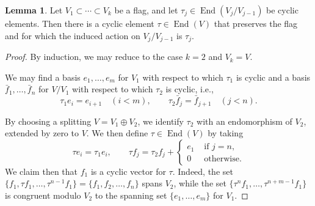 \documentclass[reqno]{amsart}
\DeclareMathOperator{\End}{End}
\theoremstyle{plain} \newtheorem{theorem} {Theorem} \newtheorem{conjecture} {Conjecture} \newtheorem{corollary} [theorem] {Corollary} \newtheorem{proposition} [theorem] {Proposition} \newtheorem{fact} [theorem] {Fact}
\theoremstyle{definition} \newtheorem{definition} [theorem] {Definition}
\theoremstyle{itplain} %
\newtheorem{lemma}[theorem]{Lemma}
\begin{document}
\begin{lemma}\label{lemma:let-v_1-subs-dotsb-subs-v_k-be-flag-let-tau_j-in-e}
  Let $V_1 \subset \dotsb \subset V_k$ be a flag, and let $\tau_j \in \End(V_j / V_{j-1})$ be cyclic elements.  Then there is a cyclic element $\tau \in \End(V)$ that preserves the flag and for which the induced action on $V_j / V_{j-1}$ is $\tau_j$.
\end{lemma}
\begin{proof}
  By induction, we may reduce to the case $k = 2$ and $V_k = V$.
  
  We may find a basis $e_1,\dotsc,e_m$ for $V_1$ with respect to which $\tau_1$ is cyclic and a basis $\bar{f}_1,\dotsc,\bar{f}_n$ for $V/V_1$ with respect to which $\tau_2$ is cyclic, i.e.,
  \begin{equation*}
    \tau_1 e_i = e_{i+1}  \quad (i  < m), \qquad
    \tau_2 \bar{f}_j = \bar{f}_{j+1} \quad (j < n).
  \end{equation*}

  By choosing a splitting $V = V_1 \oplus V_2$, we identify $\tau_2$ with an endomorphism of $V_2$, extended by zero to $V$.  We then define $\tau \in \End(V)$ by taking
  \begin{equation*}
    \tau e_i = \tau_1 e_{i},
    \qquad
    \tau f_j =
    \tau_2 f_j
    +
    \begin{cases}
      e_1 & \text{ if } j = n, \\
      0 & \text{ otherwise.}
    \end{cases}
  \end{equation*}
  We claim then that $f_1$ is a cyclic vector for $\tau$.  Indeed, the set $\{f_1, \tau f_1, \dotsc, \tau^{n-1} f_1\} = \{f_1, f_2, \dotsc, f_{n}\}$ spans $V_2$, while the set $\{\tau^n f_1, \dotsc, \tau^{n+m-1} f_1\}$ is congruent modulo $V_2$ to the spanning set $\{e_1, \dotsc, e_m\}$ for $V_1$.
\end{proof}
\end{document}
